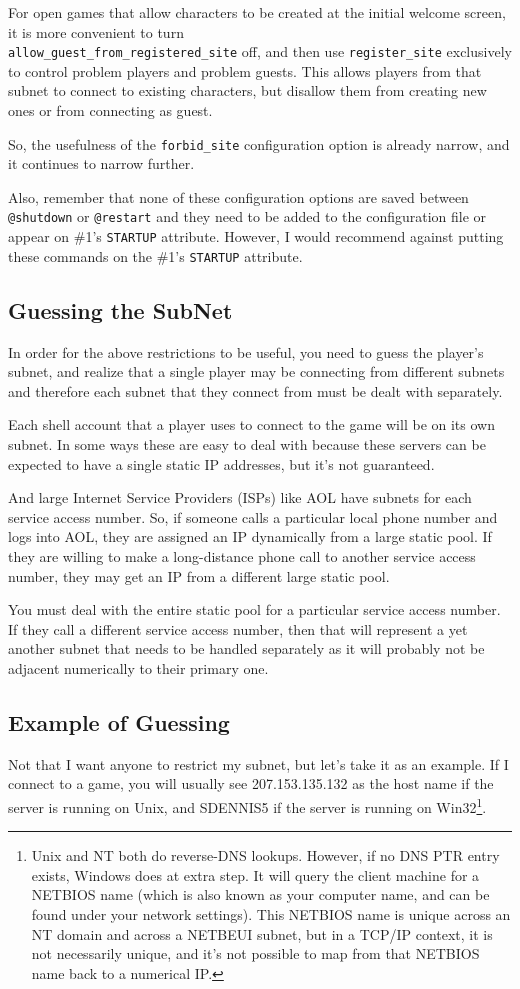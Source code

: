 \documentclass[10pt,letterpaper]{book}
\begin{document}
For open games that allow characters to be created at the initial welcome
screen, it is more convenient to turn\\
\texttt{allow\_guest\_from\_registered\_site} off, and then use
\texttt{register\_site} exclusively to control problem players and problem
guests. This allows players from that subnet to connect to existing
characters, but disallow them from creating new ones or from connecting as
guest.

So, the usefulness of the \texttt{forbid\_site} configuration option is
already narrow, and it continues to narrow further.

Also, remember that none of these configuration options are saved between
\texttt{@shutdown} or \texttt{@restart} and they need to be added to the
configuration file or appear on \#1's \texttt{STARTUP} attribute. However,
I would recommend against putting these commands on the \#1's \texttt{STARTUP}
attribute.
\subsection{Guessing the SubNet}
In order for the above restrictions to be useful, you need to guess the
player's subnet, and realize that a single player may be connecting from
different subnets and therefore each subnet that they connect from must be
dealt with separately.

Each shell account that a player uses to connect to the game will be on its
own subnet. In some ways these are easy to deal with because these servers
can be expected to have a single static IP addresses, but it's not
guaranteed.

And large Internet Service Providers (ISPs) like AOL have subnets for each
service access number. So, if someone calls a particular local phone number
and logs into AOL, they are assigned an IP dynamically from a large static
pool. If they are willing to make a long-distance phone call to another
service access number, they may get an IP from a different large static
pool.

You must deal with the entire static pool for a particular service access
number. If they call a different service access number, then that will
represent a yet another subnet that needs to be handled separately as it will
probably not be adjacent numerically to their primary one.
\subsection{Example of Guessing}
Not that I want anyone to restrict my subnet, but let's take it as an example.
If I connect to a game, you will usually see 207.153.135.132 as the host name
if the server is running on Unix, and SDENNIS5 if the server is running on
Win32\footnote{Unix and NT both do reverse-DNS lookups. However, if no DNS
PTR entry exists, Windows does at extra step. It will query the client
machine for a NETBIOS name (which is also known as your computer name, and
can be found under your network settings). This NETBIOS name is unique
across an NT domain and across a NETBEUI subnet, but in a TCP/IP context,
it is not necessarily unique, and it's not possible to map from that NETBIOS
name back to a numerical IP.}.
\end{document}
